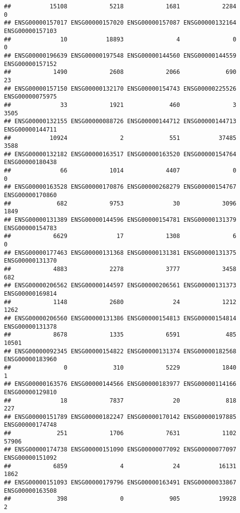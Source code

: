 \documentclass[
]{article}
\begin{document}
\begin{verbatim}
##           15108            5218            1681            2284               0 
## ENSG00000157017 ENSG00000157020 ENSG00000157087 ENSG00000132164 ENSG00000157103 
##              10           18893               4               0               0 
## ENSG00000196639 ENSG00000197548 ENSG00000144560 ENSG00000144559 ENSG00000157152 
##            1490            2608            2066             690              23 
## ENSG00000157150 ENSG00000132170 ENSG00000154743 ENSG00000225526 ENSG00000075975 
##              33            1921             460               3            3505 
## ENSG00000132155 ENSG00000088726 ENSG00000144712 ENSG00000144713 ENSG00000144711 
##           10924               2             551           37485            3588 
## ENSG00000132182 ENSG00000163517 ENSG00000163520 ENSG00000154764 ENSG00000180438 
##              66            1014            4407               0               0 
## ENSG00000163528 ENSG00000170876 ENSG00000268279 ENSG00000154767 ENSG00000170860 
##             682            9753              30            3096            1849 
## ENSG00000131389 ENSG00000144596 ENSG00000154781 ENSG00000131379 ENSG00000154783 
##            6629              17            1308               6               0 
## ENSG00000177463 ENSG00000131368 ENSG00000131381 ENSG00000131375 ENSG00000131370 
##            4883            2278            3777            3458             682 
## ENSG00000206562 ENSG00000144597 ENSG00000206561 ENSG00000131373 ENSG00000169814 
##            1148            2680              24            1212            1262 
## ENSG00000206560 ENSG00000131386 ENSG00000154813 ENSG00000154814 ENSG00000131378 
##            8678            1335            6591             485           10501 
## ENSG00000092345 ENSG00000154822 ENSG00000131374 ENSG00000182568 ENSG00000183960 
##               0             310            5229            1840               1 
## ENSG00000163576 ENSG00000144566 ENSG00000183977 ENSG00000114166 ENSG00000129810 
##              18            7837              20             818             227 
## ENSG00000151789 ENSG00000182247 ENSG00000170142 ENSG00000197885 ENSG00000174748 
##             251            1706            7631            1102           57906 
## ENSG00000174738 ENSG00000151090 ENSG00000077092 ENSG00000077097 ENSG00000151092 
##            6859               4              24           16131            1862 
## ENSG00000151093 ENSG00000179796 ENSG00000163491 ENSG00000033867 ENSG00000163508 
##             398               0             905           19928               2 

\end{verbatim}
\end{document}
